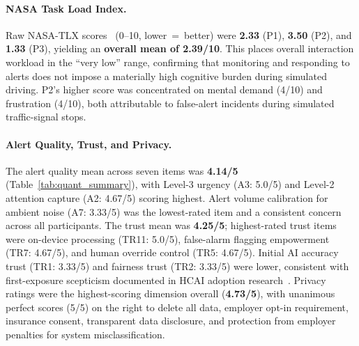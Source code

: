 \documentclass[sigconf]{acmart}
\begin{document}
\paragraph{NASA Task Load Index.}
Raw NASA-TLX scores~\cite{ref16} (0--10, lower~=~better) were \textbf{2.33} (P1), \textbf{3.50} (P2), and \textbf{1.33} (P3), yielding an \textbf{overall mean of 2.39/10}. This places overall interaction workload in the ``very low'' range, confirming that monitoring and responding to alerts does not impose a materially high cognitive burden during simulated driving. P2's higher score was concentrated on mental demand (4/10) and frustration (4/10), both attributable to false-alert incidents during simulated traffic-signal stops.

\paragraph{Alert Quality, Trust, and Privacy.}
The alert quality mean across seven items was \textbf{4.14/5} (Table~\ref{tab:quant_summary}), with Level-3 urgency (A3: 5.0/5) and Level-2 attention capture (A2: 4.67/5) scoring highest. Alert volume calibration for ambient noise (A7: 3.33/5) was the lowest-rated item and a consistent concern across all participants. The trust mean was \textbf{4.25/5}; highest-rated trust items were on-device processing (TR11: 5.0/5), false-alarm flagging empowerment (TR7: 4.67/5), and human override control (TR5: 4.67/5). Initial AI accuracy trust (TR1: 3.33/5) and fairness trust (TR2: 3.33/5) were lower, consistent with first-exposure scepticism documented in HCAI adoption research~\cite{ref23}. Privacy ratings were the highest-scoring dimension overall (\textbf{4.73/5}), with unanimous perfect scores (5/5) on the right to delete all data, employer opt-in requirement, insurance consent, transparent data disclosure, and protection from employer penalties for system misclassification.
\end{document}
